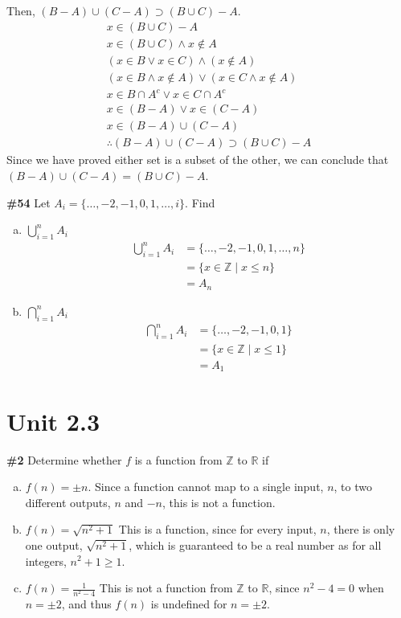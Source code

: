 \documentclass{article}
\newcommand{\unit}[1]{\section{Unit #1}}
\newcommand{\problem}[1]{\textbf{\##1}}
\newcommand{\prob}[1]{\problem{#1}}
\renewcommand{\And}{\wedge}
\newcommand{\Or}{\vee}
\newcommand{\intersection}{\cap}
\newcommand{\union}{\cup}
\newcommand{\AllIntegers}{\mathbb{Z}}
\newcommand{\AllReals}{\mathbb{R}}
\begin{document}
\begin{enumerate}
    Then, \((B-A)\union (C-A) \supset (B\union C)-A\).
    \begin{align*}
        x \in (B \union C) - A\\
        x \in (B \union C) \And x \notin A\\
        (x \in B \Or x \in C) \And (x \notin A)\\
        (x \in B \And x \notin A) \Or (x \in C \And x \notin A)\\
        x \in B \intersection A^{c} \Or x \in C \intersection A^{c}\\
        x \in (B-A) \Or x \in (C-A)\\
        x \in (B-A) \union (C-A)\\
        \therefore (B-A)\union (C-A) \supset (B\union C)-A
    \end{align*}
    Since we have proved either set is a subset of the other, we can conclude that \((B-A)\union (C-A) = (B\union C)-A\).
\end{enumerate}

\pagebreak
\prob{54}
Let \(A_{i} = \{\dots, -2, -1, 0, 1, \dots, i\}\). Find
\begin{enumerate}[a)]
    \item \(\bigcup\limits_{i=1}^{n}A_i\)
    \begin{align*}
        \bigcup\limits_{i=1}^{n}A_i &= \{\dots, -2, -1, 0, 1, \dots, n\}\\
        &= \{x \in \AllIntegers \mid x \leq n\}\\
        &= A_{n}
    \end{align*}
    \item \(\bigcap\limits_{i=1}^{n}A_i\) 
    \begin{align*}
        \bigcap\limits_{i=1}^{n}A_i &= \{\dots, -2, -1, 0, 1\}\\
        &= \{x \in \AllIntegers \mid x \leq 1\}\\
        &= A_{1}
    \end{align*}
\end{enumerate}

\pagebreak
\unit{2.3}
\prob{2}
Determine whether \(f\) is a function from \(\AllIntegers\) to \(\AllReals\) if 
\begin{enumerate}[a)]
    \item \(f(n) = \pm n. \)
    Since a function cannot map to a single input, \(n\), to two different outputs, \(n\) and \(-n\), this is not a function.
    \item \(f(n) = \sqrt{n^2 + 1}\)
    This is a function, since for every input, \(n\), there is only one output, \(\sqrt{n^2 + 1}\), which is guaranteed to be a real number as for all integers, \(n^2 + 1 \geq 1\).
    \item \(f(n)=\frac{1}{n^2-4}\)
    This is not a function from \(\AllIntegers\) to \(\AllReals\), since \(n^2 - 4 = 0\) when \(n = \pm 2\), and thus \(f(n)\) is undefined for \(n = \pm 2\).
\end{enumerate}
\end{document}
